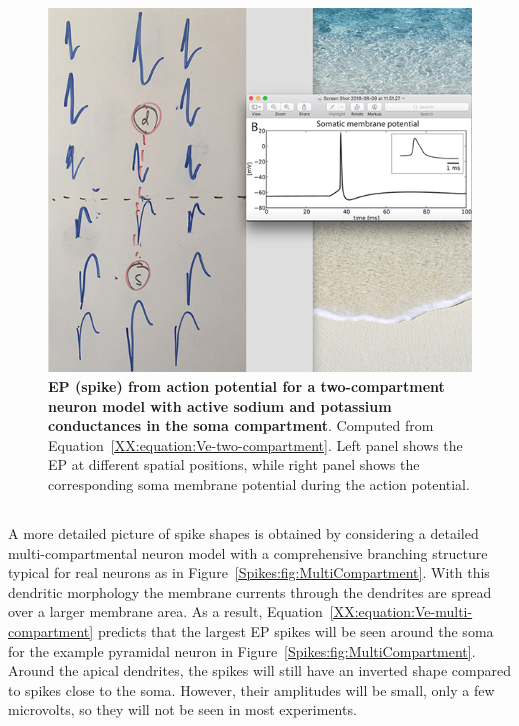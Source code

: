 \begin{figure}[!ht]
\begin{center}
\includegraphics{Figures/Spikes/Spikes-TwoCompartment-w100-r150}
\end{center}
\caption{\textbf{EP (spike) from action potential for a two-compartment neuron model with active sodium
and potassium conductances in the soma compartment}. Computed from 
Equation~\ref{XX:equation:Ve-two-compartment}.
Left panel shows the EP at different spatial positions, while right panel shows the corresponding
soma membrane potential during the action potential. 
}
\label{Spikes:fig:TwoCompartment}
\end{figure}

\subsection{}
\label{Spikes:sec:EP-spikes-multi-compartment}
A more detailed picture of spike shapes is obtained by considering a detailed multi-compartmental neuron model
with a comprehensive branching structure typical for real neurons as in Figure~\ref{Spikes:fig:MultiCompartment}.
With this dendritic morphology the membrane currents through the dendrites are spread over a larger membrane area.
As a result, Equation~\ref{XX:equation:Ve-multi-compartment} predicts that the largest EP spikes will be seen
around the soma for the example pyramidal neuron in Figure~\ref{Spikes:fig:MultiCompartment}.  
Around the apical dendrites, the spikes will still have an inverted shape compared to spikes close to the soma. 
However, their amplitudes will be small, only a few microvolts, so they will not be seen in most experiments.

